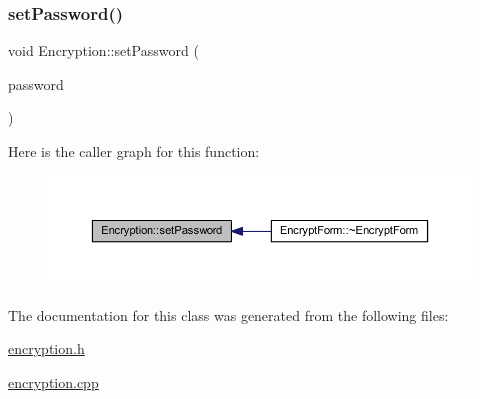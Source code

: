 \subsubsection{\texorpdfstring{set\+Password()}{setPassword()}}
{\footnotesize\ttfamily void Encryption\+::set\+Password (\begin{DoxyParamCaption}\item[{Q\+String}]{password }\end{DoxyParamCaption})}

Here is the caller graph for this function\+:
\nopagebreak
\begin{figure}[H]
\begin{center}
\leavevmode
\includegraphics[width=350pt]{class_encryption_a8ddf113b231bf2f60d5714cdf0d07857_icgraph}
\end{center}
\end{figure}


The documentation for this class was generated from the following files\+:\begin{DoxyCompactItemize}
\item 
\hyperlink{encryption_8h}{encryption.\+h}\item 
\hyperlink{encryption_8cpp}{encryption.\+cpp}\end{DoxyCompactItemize}
